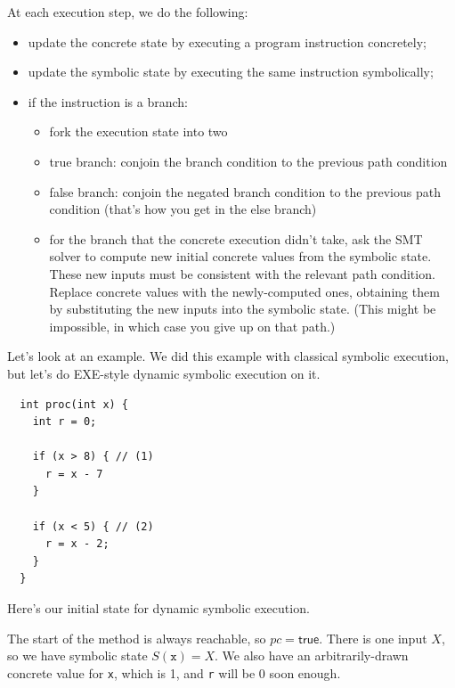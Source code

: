 \documentclass[11pt]{article}
\begin{document}
At each execution step, we do the following:
\begin{itemize}[noitemsep]
\item update the concrete state by executing a program instruction concretely;
\item update the symbolic state by executing the same instruction symbolically;
\item if the instruction is a branch:
  \begin{itemize}
    \item fork the execution state into two
    \item true branch: conjoin the branch condition to the previous path condition
    \item false branch: conjoin the negated branch condition to the previous path condition (that's how you get in the else branch)
    \item for the branch that the concrete execution didn't take, ask the SMT solver to compute new initial concrete values from the symbolic state. These new inputs must be consistent with the relevant path condition. Replace concrete values with the newly-computed ones, obtaining them by substituting the new inputs into the symbolic state. (This might be impossible, in which case you give up on that path.)
  \end{itemize}
\end{itemize}
Let's look at an example. We did this example with classical symbolic execution, but let's do EXE-style dynamic symbolic execution on it.
\begin{lstlisting}
  int proc(int x) {
    int r = 0;

    if (x > 8) { // (1)
      r = x - 7
    }

    if (x < 5) { // (2)
      r = x - 2;
    }
  }
\end{lstlisting}

Here's our initial state for dynamic symbolic execution.

\begin{center}
\end{center}
The start of the method is always reachable, so \textbf{$pc = \textsf{true}$}. There is one input $X$,
so we have symbolic state $S(\mathtt{x}) = X$. We also have an arbitrarily-drawn concrete value for
\texttt{x}, which is 1, and \texttt{r} will be 0 soon enough.
\end{document}
